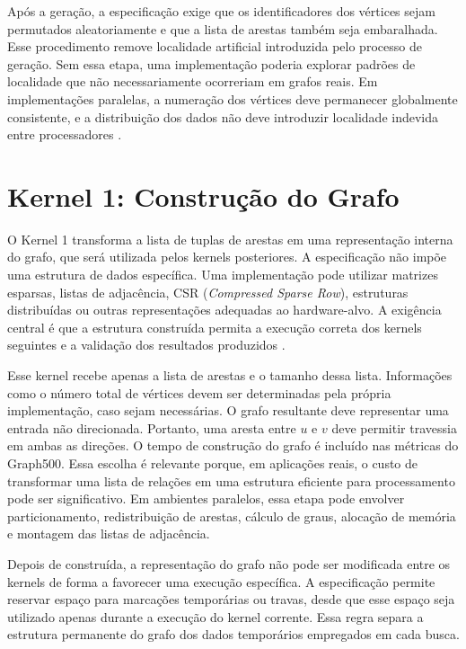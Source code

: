 Após a geração, a especificação exige que os identificadores dos vértices sejam permutados aleatoriamente e que a lista de arestas também seja embaralhada. Esse procedimento remove localidade artificial introduzida pelo processo de geração. Sem essa etapa, uma implementação poderia explorar padrões de localidade que não necessariamente ocorreriam em grafos reais. Em implementações paralelas, a numeração dos vértices deve permanecer globalmente consistente, e a distribuição dos dados não deve introduzir localidade indevida entre processadores \cite{graph500spec}.

\section{Kernel 1: Construção do Grafo}
\label{sec:graph500-kernel1}

O Kernel 1 transforma a lista de tuplas de arestas em uma representação interna do grafo, que será utilizada pelos kernels posteriores. A especificação não impõe uma estrutura de dados específica. Uma implementação pode utilizar matrizes esparsas, listas de adjacência, CSR (\textit{Compressed Sparse Row}), estruturas distribuídas ou outras representações adequadas ao hardware-alvo. 
A exigência central é que a estrutura construída permita a execução correta dos kernels seguintes e a validação dos resultados produzidos \cite{graph500spec}.

Esse kernel recebe apenas a lista de arestas e o tamanho dessa lista. Informações como o número total de vértices devem ser determinadas pela própria implementação, caso sejam necessárias. O grafo resultante deve representar uma entrada não direcionada. Portanto, uma aresta entre $u$ e $v$ deve permitir travessia em ambas as direções.
O tempo de construção do grafo é incluído nas métricas do Graph500. 
Essa escolha é relevante porque, em aplicações reais, o custo de transformar uma lista de relações em uma estrutura eficiente para processamento pode ser significativo. Em ambientes paralelos, essa etapa pode envolver particionamento, redistribuição de arestas, cálculo de graus, alocação de memória e montagem das listas de adjacência.

Depois de construída, a representação do grafo não pode ser modificada entre os kernels de forma a favorecer uma execução específica. A especificação permite reservar espaço para marcações temporárias ou travas, desde que esse espaço seja utilizado apenas durante a execução do kernel corrente. Essa regra separa a estrutura permanente do grafo dos dados temporários empregados em cada busca.

